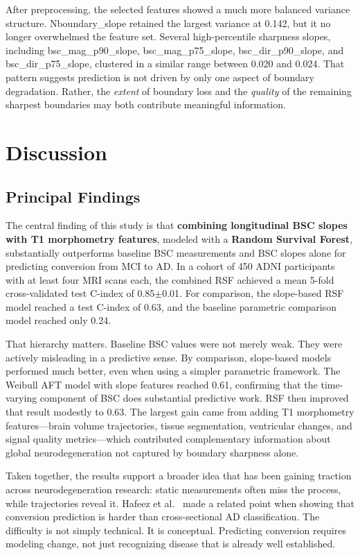 \documentclass[blue]{ludusofficial}
\begin{document}
After preprocessing, the selected features showed a much more balanced variance structure. Nboundary\_slope retained the largest variance at 0.142, but it no longer overwhelmed the feature set. Several high-percentile sharpness slopes, including bsc\_mag\_p90\_slope, bsc\_mag\_p75\_slope, bsc\_dir\_p90\_slope, and bsc\_dir\_p75\_slope, clustered in a similar range between 0.020 and 0.024. That pattern suggests prediction is not driven by only one aspect of boundary degradation. Rather, the \textit{extent} of boundary loss and the \textit{quality} of the remaining sharpest boundaries may both contribute meaningful information.

\section{Discussion}

\subsection{Principal Findings}

The central finding of this study is that \textbf{combining longitudinal BSC slopes with T1 morphometry features}, modeled with a \textbf{Random Survival Forest}, substantially outperforms baseline BSC measurements and BSC slopes alone for predicting conversion from MCI to AD. In a cohort of 450 ADNI participants with at least four MRI scans each, the combined RSF achieved a mean 5-fold cross-validated test C-index of 0.85$\pm$0.01. For comparison, the slope-based RSF model reached a test C-index of 0.63, and the baseline parametric comparison model reached only 0.24.

That hierarchy matters. Baseline BSC values were not merely weak. They were actively misleading in a predictive sense. By comparison, slope-based models performed much better, even when using a simpler parametric framework. The Weibull AFT model with slope features reached 0.61, confirming that the time-varying component of BSC does substantial predictive work. RSF then improved that result modestly to 0.63. The largest gain came from adding T1 morphometry features---brain volume trajectories, tissue segmentation, ventricular changes, and signal quality metrics---which contributed complementary information about global neurodegeneration not captured by boundary sharpness alone.

Taken together, the results support a broader idea that has been gaining traction across neurodegeneration research: static measurements often miss the process, while trajectories reveal it. Hafeez et al.~\cite{hafeez2024deep} made a related point when showing that conversion prediction is harder than cross-sectional AD classification. The difficulty is not simply technical. It is conceptual. Predicting conversion requires modeling change, not just recognizing disease that is already well established.
\end{document}
